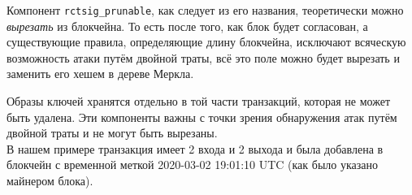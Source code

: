 \begin{appendices}

Компонент {\tt rctsig\_prunable}, как следует из его названия, теоретически можно {\sl вырезать} из блокчейна. То есть после того, как блок будет согласован, а существующие правила, определяющие длину блокчейна, исключают всяческую возможность атаки путём двойной траты, всё это поле можно будет вырезать и заменить его хешем в дереве Меркла.

Образы ключей хранятся отдельно в той части транзакций, которая не может быть удалена. Эти компоненты важны с точки зрения обнаружения атак путём двойной траты и не могут быть вырезаны.
\\

В нашем примере транзакция имеет 2 входа и 2 выхода и была добавлена в блокчейн с временной меткой 2020-03-02 19:01:10 UTC (как было указано майнером блока).


\end{appendices}
